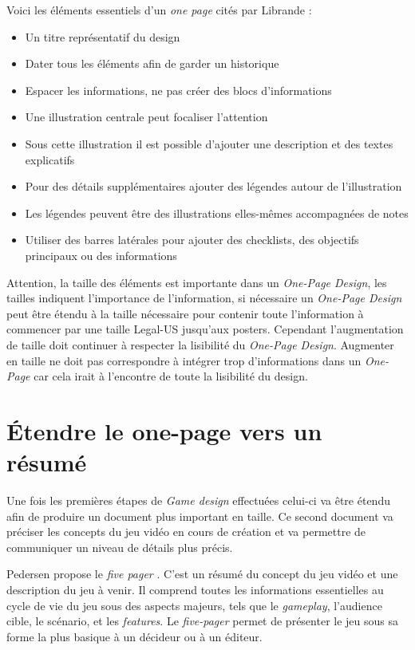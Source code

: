 Voici les éléments essentiels d'un \emph{one page} cités par Librande \cite{onepage_librande}:
\begin{itemize}
    \item Un titre représentatif du design
    \item Dater tous les éléments afin de garder un historique
    \item Espacer les informations, ne pas créer des blocs d'informations
    \item Une illustration centrale peut focaliser l'attention
    \item Sous cette illustration il est possible d'ajouter une description et des textes explicatifs
    \item Pour des détails supplémentaires ajouter des légendes autour de l'illustration
    \item Les légendes peuvent être des illustrations elles-mêmes accompagnées de notes
    \item Utiliser des barres latérales pour ajouter des checklists, des objectifs principaux ou des informations
\end{itemize}
Attention, la taille des éléments est importante dans un \emph{One-Page Design}, les tailles indiquent l'importance de l'information, si nécessaire un \emph{One-Page Design} peut être étendu à la taille nécessaire pour contenir toute l'information à commencer par une taille Legal-US jusqu'aux posters.
Cependant l'augmentation de taille doit continuer à respecter la lisibilité du \emph{One-Page Design}. Augmenter en taille ne doit pas correspondre à intégrer trop d'informations dans un \emph{One-Page} car cela irait à l'encontre de toute la lisibilité du design.



\section{Étendre le one-page vers un résumé}
Une fois les premières étapes de \emph{Game design} effectuées celui-ci va être étendu afin de produire un document plus important en taille. Ce second document va préciser les concepts du jeu vidéo en cours de création et va permettre de communiquer un niveau de détails plus précis.

Pedersen propose le \emph{\guillemotleft five pager \guillemotright}  \cite{GD_foundations_pedersen}. C'est un résumé du concept du jeu vidéo et une description du jeu à venir. Il comprend toutes les informations essentielles au cycle de vie du jeu sous des aspects majeurs, tels que le \emph{gameplay}, l'audience cible, le scénario, et les \emph{features}. Le \emph{five-pager} permet de présenter le jeu sous sa forme la plus basique à un décideur ou à un éditeur.

